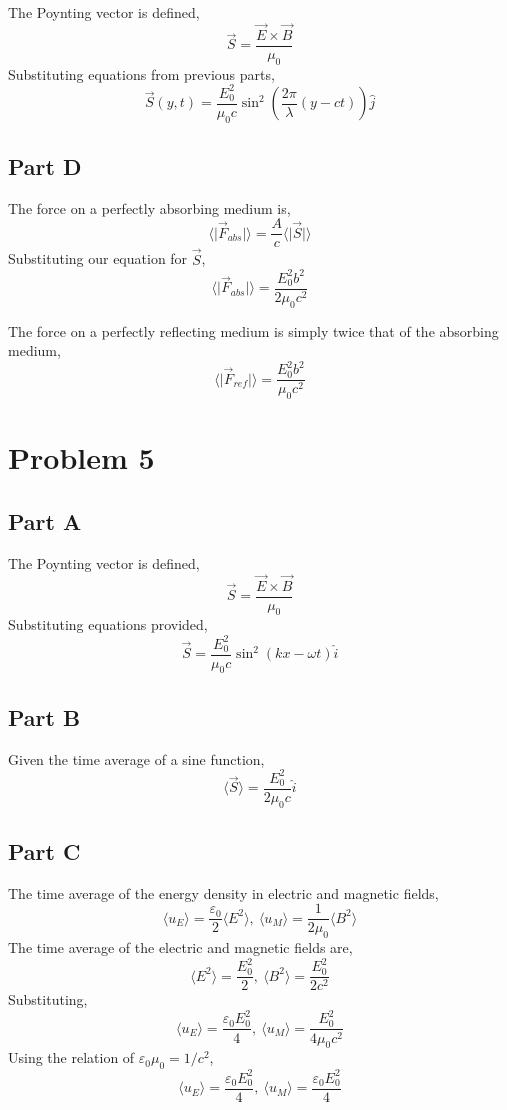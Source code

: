 \documentclass{article}
\begin{document}
The Poynting vector is defined,
$$ \vec{S} = \frac{\vec{E} \times \vec{B}}{\mu_0} $$
Substituting equations from previous parts,
$$ \vec{S}(y, t) = \frac{E_0^2}{\mu_0 c} \sin^2 \left(\frac{2 \pi}{\lambda}
\left(y - ct \right) \right) \hat{j} $$

\subsection*{Part D}

The force on a perfectly absorbing medium is,
$$ \langle \vert \vec{F}_{abs} \vert \rangle = \frac{A}{c} \langle \vert \vec{S}
\vert \rangle $$
Substituting our equation for $\vec{S}$,
$$ \langle \vert \vec{F}_{abs} \vert \rangle = \frac{E_0^2 b^2}{2 \mu_0 c^2} $$

The force on a perfectly reflecting medium is simply twice that of the absorbing
medium,
$$ \langle \vert \vec{F}_{ref} \vert \rangle = \frac{E_0^2 b^2}{\mu_0 c^2} $$

\section*{Problem 5}

\subsection*{Part A}

The Poynting vector is defined,
$$ \vec{S} = \frac{\vec{E} \times \vec{B}}{\mu_0} $$
Substituting equations provided,
$$ \vec{S} = \frac{E_0^2}{\mu_0 c} \sin^2 \left(kx - \omega t \right) \hat{i} $$

\subsection*{Part B}

Given the time average of a sine function,
$$ \langle \vec{S} \rangle = \frac{E_0^2}{2 \mu_0 c} \hat{i} $$

\subsection*{Part C}

The time average of the energy density in electric and magnetic fields,
$$ \langle u_E \rangle = \frac{\varepsilon_0}{2} \langle E^2 \rangle,\ \langle
u_M \rangle = \frac{1}{2 \mu_0} \langle B^2 \rangle $$
The time average of the electric and magnetic fields are,
$$ \langle E^2 \rangle = \frac{E_0^2}{2},\ \langle B^2 \rangle =
\frac{E_0^2}{2c^2} $$
Substituting,
$$ \langle u_E \rangle = \frac{\varepsilon_0 E_0^2}{4},\ \langle u_M \rangle =
\frac{E_0^2}{4 \mu_0 c^2} $$
Using the relation of $\varepsilon_0 \mu_0 = 1/c^2$,
$$ \langle u_E \rangle = \frac{\varepsilon_0 E_0^2}{4},\ \langle u_M \rangle =
\frac{\varepsilon_0 E_0^2}{4} $$
\end{document}
